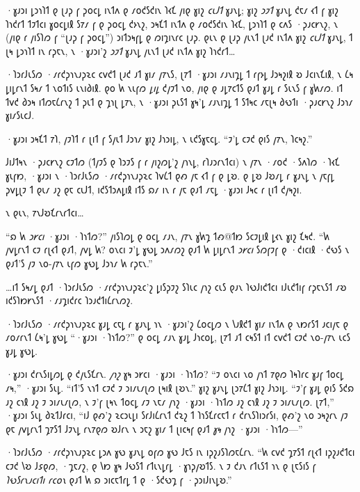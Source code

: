 ·𐑣𐑨𐑮𐑦 𐑛𐑮𐑪𐑐𐑑 𐑞 𐑚𐑨𐑜 𐑝 𐑜𐑴𐑤𐑛 𐑦𐑯𐑑𐑵 𐑞 𐑥𐑴𐑒𐑕𐑒𐑦𐑯 𐑐𐑬𐑗 𐑢𐑦𐑞 𐑣𐑦𐑟 \emph{𐑤𐑧𐑓𐑑} 𐑣𐑨𐑯𐑛; 𐑣𐑦𐑟 \emph{𐑮𐑲𐑑} 𐑣𐑨𐑯𐑛 𐑒𐑱𐑥 𐑬𐑑 𐑝 𐑣𐑦𐑟 𐑐𐑪𐑒𐑩𐑑 𐑑𐑲𐑑𐑤𐑦 𐑣𐑴𐑤𐑛𐑦𐑙 𐑕𐑳𐑥 𐑝 𐑞 𐑜𐑴𐑤𐑛 𐑒𐑶𐑯𐑟, 𐑮𐑰𐑗𐑑 𐑦𐑯𐑑𐑵 𐑞 𐑥𐑴𐑒𐑕𐑒𐑦𐑯 𐑐𐑬𐑗, 𐑛𐑮𐑪𐑐𐑑 𐑞 𐑤𐑵𐑕 ·𐑜𐑨𐑤𐑾𐑯𐑟, 𐑯 (𐑢𐑦𐑞 𐑩 𐑢𐑦𐑕𐑐𐑼 𐑝 “𐑚𐑨𐑜 𐑝 𐑜𐑴𐑤𐑛”) 𐑮𐑦𐑑𐑮𐑰𐑝𐑛 𐑞 𐑼𐑦𐑡𐑦𐑯𐑩𐑤 𐑚𐑨𐑜. 𐑞𐑧𐑯 𐑞 𐑚𐑨𐑜 𐑢𐑧𐑯𐑑 𐑚𐑨𐑒 𐑦𐑯𐑑𐑵 𐑣𐑦𐑟 \emph{𐑤𐑧𐑓𐑑} 𐑣𐑨𐑯𐑛, 𐑑 𐑚𐑰 𐑛𐑮𐑪𐑐𐑑 𐑦𐑯 𐑩𐑜𐑱𐑯, 𐑯 ·𐑣𐑨𐑮𐑦'𐑟 \emph{𐑮𐑲𐑑} 𐑣𐑨𐑯𐑛 𐑢𐑧𐑯𐑑 𐑚𐑨𐑒 𐑦𐑯𐑑𐑵 𐑣𐑦𐑟 𐑐𐑪𐑒𐑩𐑑…

·𐑐𐑮𐑩𐑓𐑧𐑕𐑼 ·𐑥𐑩𐑒𐑜𐑪𐑯𐑨𐑜𐑷𐑤 𐑤𐑫𐑒𐑑 𐑚𐑨𐑒 𐑨𐑑 𐑣𐑦𐑥 𐑢𐑳𐑯𐑕, 𐑚𐑳𐑑 ·𐑣𐑨𐑮𐑦 𐑥𐑨𐑯𐑦𐑡𐑛 𐑑 𐑩𐑝𐑶𐑛 𐑓𐑮𐑰𐑟𐑦𐑙 𐑹 𐑓𐑤𐑦𐑯𐑗𐑦𐑙, 𐑯 𐑖𐑰 𐑛𐑦𐑛𐑩𐑯𐑑 𐑕𐑰𐑥 𐑑 𐑯𐑴𐑑𐑦𐑕 𐑧𐑯𐑦𐑔𐑦𐑙. 𐑞𐑴 𐑿 𐑯𐑧𐑝𐑼 \emph{𐑛𐑦𐑛} 𐑒𐑢𐑲𐑑 𐑯𐑴, 𐑢𐑦𐑞 𐑞 𐑨𐑛𐑳𐑤𐑑𐑕 𐑞𐑨𐑑 𐑣𐑨𐑛 𐑩 𐑕𐑧𐑯𐑕 𐑝 𐑣𐑿𐑥𐑼. 𐑦𐑑 𐑑𐑫𐑒 𐑔𐑮𐑰 𐑦𐑑𐑼𐑱𐑖𐑩𐑯𐑟 𐑑 𐑜𐑧𐑑 𐑞 𐑡𐑪𐑚 𐑛𐑳𐑯, 𐑯 ·𐑣𐑨𐑮𐑦 𐑜𐑧𐑕𐑑 𐑣𐑰'𐑛 𐑥𐑨𐑯𐑦𐑡𐑛 𐑑 𐑕𐑑𐑰𐑤 𐑥𐑱𐑚𐑰 𐑔𐑻𐑑𐑦 ·𐑜𐑨𐑤𐑾𐑯𐑟 𐑓𐑮𐑪𐑥 𐑣𐑦𐑥𐑕𐑧𐑤𐑓.

·𐑣𐑨𐑮𐑦 𐑮𐑰𐑗𐑑 𐑳𐑐, 𐑢𐑲𐑐𐑑 𐑩 𐑚𐑦𐑑 𐑝 𐑕𐑢𐑧𐑑 𐑓𐑮𐑪𐑥 𐑣𐑦𐑟 𐑓𐑪𐑮𐑦𐑛, 𐑯 𐑧𐑒𐑕𐑣𐑱𐑤𐑛. “𐑲'𐑛 𐑤𐑲𐑒 𐑞𐑦𐑕 𐑢𐑳𐑯, 𐑐𐑤𐑰𐑟.”

𐑓𐑦𐑓𐑑𐑰𐑯 ·𐑜𐑨𐑤𐑾𐑯𐑟 𐑤𐑲𐑑𐑼 (𐑑𐑢𐑲𐑕 𐑞 𐑐𐑮𐑲𐑕 𐑝 𐑩 𐑢𐑦𐑟𐑼𐑛'𐑟 𐑢𐑪𐑯𐑛, 𐑩𐑐𐑨𐑮𐑩𐑯𐑑𐑤𐑦) 𐑯 𐑢𐑳𐑯 ·𐑥𐑴𐑒 ·𐑕𐑵𐑐𐑼 ·𐑐𐑬𐑗  𐑣𐑧𐑝𐑽, ·𐑣𐑨𐑮𐑦 𐑯 ·𐑐𐑮𐑩𐑓𐑧𐑕𐑼 ·𐑥𐑩𐑒𐑜𐑪𐑯𐑨𐑜𐑷𐑤 𐑐𐑫𐑖𐑑 𐑞𐑺 𐑢𐑱 𐑬𐑑 𐑝 𐑞 𐑛𐑹. 𐑞 𐑛𐑹 𐑓𐑹𐑥𐑛 𐑩 𐑣𐑨𐑯𐑛 𐑯 𐑢𐑱𐑝𐑛 𐑜𐑫𐑛𐑚𐑲 𐑑 𐑞𐑧𐑥 𐑨𐑟 𐑞𐑱 𐑤𐑧𐑓𐑑, 𐑦𐑒𐑕𐑑𐑮𐑵𐑛𐑦𐑙 𐑦𐑑𐑕 𐑸𐑥 𐑦𐑯 𐑩 𐑢𐑱 𐑞𐑨𐑑 𐑥𐑱𐑛 ·𐑣𐑨𐑮𐑦 𐑓𐑰𐑤 𐑩 𐑚𐑦𐑑 𐑒𐑢𐑰𐑟𐑦.

𐑯 𐑞𐑧𐑯, 𐑳𐑯𐑓𐑹𐑗𐑩𐑯𐑩𐑑𐑤𐑦…

“𐑸 𐑿 \emph{𐑮𐑾𐑤𐑦} ·𐑣𐑨𐑮𐑦 ·𐑐𐑪𐑑𐑼?” 𐑢𐑦𐑕𐑐𐑼𐑛 𐑞 𐑴𐑤𐑛 𐑥𐑨𐑯, 𐑢𐑳𐑯 𐑣𐑿𐑡 𐑑𐑺@𐑑𐑽 𐑕𐑤𐑲𐑛𐑦𐑙 𐑛𐑬𐑯 𐑣𐑦𐑟 𐑗𐑰𐑒. “𐑿 𐑢𐑫𐑛𐑩𐑯𐑑 𐑤𐑲 𐑩𐑚𐑬𐑑 𐑞𐑨𐑑, 𐑢𐑫𐑛 𐑿? 𐑴𐑯𐑤𐑦 𐑲'𐑛 𐑣𐑻𐑛 𐑮𐑵𐑥𐑼𐑟 𐑞𐑨𐑑 𐑿 𐑛𐑦𐑛𐑩𐑯𐑑 \emph{𐑮𐑾𐑤𐑦} 𐑕𐑼𐑝𐑲𐑝 𐑞 ·𐑒𐑦𐑤𐑦𐑙 ·𐑒𐑻𐑕 𐑯 𐑞𐑨𐑑'𐑕 𐑢𐑲 𐑯𐑴-𐑢𐑳𐑯 𐑧𐑝𐑼 𐑣𐑻𐑛 𐑓𐑮𐑪𐑥 𐑿 𐑩𐑜𐑱𐑯.”

…𐑦𐑑 𐑕𐑰𐑥𐑛 𐑞𐑨𐑑 ·𐑐𐑮𐑩𐑓𐑧𐑕𐑼 ·𐑥𐑩𐑒𐑜𐑪𐑯𐑨𐑜𐑷𐑤'𐑟 𐑛𐑦𐑕𐑜𐑲𐑟 𐑕𐑐𐑧𐑤 𐑢𐑪𐑟 𐑤𐑧𐑕 𐑞𐑨𐑯 𐑐𐑻𐑓𐑦𐑒𐑑𐑤𐑦 𐑦𐑓𐑧𐑒𐑑𐑦𐑝 𐑩𐑜𐑱𐑯𐑕𐑑 𐑥𐑹 𐑦𐑒𐑕𐑐𐑽𐑾𐑯𐑕𐑑 ·𐑥𐑨𐑡𐑦𐑒𐑩𐑤 𐑐𐑮𐑨𐑒𐑑𐑦𐑖𐑩𐑯𐑼𐑟.

·𐑐𐑮𐑩𐑓𐑧𐑕𐑼 ·𐑥𐑩𐑒𐑜𐑪𐑯𐑨𐑜𐑷𐑤 𐑣𐑨𐑛 𐑤𐑱𐑛 𐑩 𐑣𐑨𐑯𐑛 𐑪𐑯 ·𐑣𐑨𐑮𐑦'𐑟 𐑖𐑴𐑤𐑛𐑼 𐑯 𐑘𐑨𐑙𐑒𐑑 𐑣𐑦𐑥 𐑦𐑯𐑑𐑵 𐑞 𐑯𐑽𐑩𐑕𐑑 𐑨𐑤𐑦𐑢𐑱 𐑞 𐑥𐑴𐑥𐑩𐑯𐑑 𐑖𐑰'𐑛 𐑣𐑻𐑛 “·𐑣𐑨𐑮𐑦 ·𐑐𐑪𐑑𐑼?” 𐑞 𐑴𐑤𐑛 𐑥𐑨𐑯 𐑣𐑨𐑛 𐑓𐑪𐑤𐑴𐑛, 𐑚𐑳𐑑 𐑨𐑑 𐑤𐑰𐑕𐑑 𐑦𐑑 𐑤𐑫𐑒𐑑 𐑤𐑲𐑒 𐑯𐑴-𐑢𐑳𐑯 𐑧𐑤𐑕 𐑣𐑨𐑛 𐑣𐑻𐑛.

·𐑣𐑨𐑮𐑦 𐑒𐑩𐑯𐑕𐑦𐑛𐑼𐑛 𐑞 𐑒𐑢𐑧𐑕𐑗𐑩𐑯. \emph{𐑢𐑪𐑟} 𐑣𐑰 𐑮𐑾𐑤𐑦 ·𐑣𐑨𐑮𐑦 ·𐑐𐑪𐑑𐑼? “𐑲 𐑴𐑯𐑤𐑦 𐑯𐑴 𐑢𐑪𐑑 𐑳𐑞𐑼 𐑐𐑰𐑐𐑩𐑤 𐑣𐑨𐑝 𐑑𐑴𐑤𐑛 𐑥𐑰,” ·𐑣𐑨𐑮𐑦 𐑕𐑧𐑛. “𐑦𐑑'𐑕 𐑯𐑪𐑑 𐑤𐑲𐑒 𐑲 𐑮𐑦𐑥𐑧𐑥𐑚𐑼 𐑚𐑰𐑦𐑙 𐑚𐑹𐑯.” 𐑣𐑦𐑟 𐑣𐑨𐑯𐑛 𐑚𐑮𐑳𐑖𐑑 𐑣𐑦𐑟 𐑓𐑪𐑮𐑦𐑛. “𐑲'𐑝 𐑣𐑨𐑛 𐑞𐑦𐑕 𐑕𐑒𐑸 𐑨𐑟 𐑤𐑪𐑙 𐑨𐑟 𐑲 𐑮𐑦𐑥𐑧𐑥𐑚𐑼, 𐑯 𐑲'𐑝 𐑚𐑰𐑯 𐑑𐑴𐑤𐑛 𐑥𐑲 𐑯𐑱𐑥 𐑢𐑪𐑟 ·𐑣𐑨𐑮𐑦 ·𐑐𐑪𐑑𐑼 𐑨𐑟 𐑤𐑪𐑙 𐑨𐑟 𐑲 𐑮𐑦𐑥𐑧𐑥𐑚𐑼. 𐑚𐑳𐑑,” ·𐑣𐑨𐑮𐑦 𐑕𐑧𐑛 𐑔𐑷𐑑𐑓𐑩𐑤𐑦, “𐑦𐑓 𐑞𐑺'𐑟 𐑷𐑤𐑮𐑧𐑛𐑦 𐑕𐑩𐑓𐑦𐑖𐑩𐑯𐑑 𐑒𐑷𐑟 𐑑 𐑐𐑪𐑕𐑗𐑩𐑤𐑱𐑑 𐑩 𐑒𐑩𐑯𐑕𐑐𐑦𐑮𐑩𐑕𐑦, 𐑞𐑺'𐑟 𐑯𐑴 𐑮𐑰𐑟𐑩𐑯 𐑢𐑲 𐑞𐑱 𐑢𐑫𐑛𐑩𐑯𐑑 𐑡𐑳𐑕𐑑 𐑓𐑲𐑯𐑛 𐑩𐑯𐑳𐑞𐑼 𐑹𐑓𐑩𐑯 𐑯 𐑮𐑱𐑟 𐑣𐑦𐑥 𐑑 𐑚𐑦𐑤𐑰𐑝 𐑞𐑨𐑑 \emph{𐑣𐑰} 𐑢𐑪𐑟 ·𐑣𐑨𐑮𐑦 ·𐑐𐑪𐑑𐑼—”

·𐑐𐑮𐑩𐑓𐑧𐑕𐑼 ·𐑥𐑩𐑒𐑜𐑪𐑯𐑨𐑜𐑷𐑤 𐑛𐑮𐑵 𐑣𐑻 𐑣𐑨𐑯𐑛 𐑴𐑝𐑼 𐑣𐑻 𐑓𐑱𐑕 𐑦𐑯 𐑦𐑜𐑟𐑨𐑕𐑐𐑼𐑱𐑖𐑩𐑯. “𐑿 𐑤𐑫𐑒 𐑡𐑳𐑕𐑑 𐑩𐑚𐑬𐑑 𐑦𐑜𐑟𐑨𐑒𐑑𐑤𐑦 𐑤𐑲𐑒 𐑘𐑹 𐑓𐑭𐑞𐑼, ·𐑡𐑱𐑥𐑟, 𐑞 𐑘𐑽 𐑣𐑰 𐑓𐑻𐑕𐑑 𐑩𐑑𐑧𐑯𐑛𐑩𐑛 ·𐑣𐑪𐑜𐑢𐑹𐑑𐑕. 𐑯 𐑲 𐑒𐑨𐑯 𐑩𐑑𐑧𐑕𐑑 𐑪𐑯 𐑞 𐑚𐑱𐑕𐑦𐑕 𐑝 \emph{𐑐𐑻𐑕𐑩𐑯𐑨𐑤𐑦𐑑𐑦 𐑩𐑤𐑴𐑯} 𐑞𐑨𐑑 𐑿 𐑸 𐑮𐑦𐑤𐑱𐑑𐑩𐑛 𐑑 𐑞 ·𐑕𐑒𐑻𐑡 𐑝 ·𐑜𐑮𐑦𐑓𐑦𐑯𐑛𐑹.”

